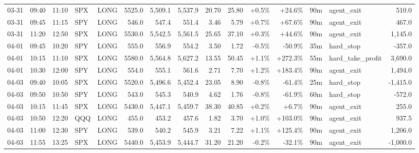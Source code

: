 \documentclass[11pt,a4paper,twoside]{article}
\begin{document}
\begin{landscape}
\begin{center}
\begin{longtable}{>{\color{txtmain}}l l l l l r r r r r r r r >{\color{txtmain}}l r}
03-31 & 09:40 & 11:10 & SPX & LONG & 5525.0 & 5,509.1 & 5,537.9 & 20.70 & 25.80 & \textcolor{wingreen}{+0.5\%} & \textcolor{wingreen}{+24.6\%} & 90m & agent\_exit & \textcolor{wingreen}{510.0} \\
03-31 & 09:45 & 11:15 & SPY & LONG & 546.0 & 547.4 & 551.4 & 3.46 & 5.79 & \textcolor{wingreen}{+0.7\%} & \textcolor{wingreen}{+67.6\%} & 90m & agent\_exit & \textcolor{wingreen}{467.0} \\
03-31 & 11:20 & 12:50 & SPX & LONG & 5530.0 & 5,542.5 & 5,561.5 & 25.65 & 37.10 & \textcolor{wingreen}{+0.3\%} & \textcolor{wingreen}{+44.6\%} & 90m & agent\_exit & \textcolor{wingreen}{1,145.0} \\
04-01 & 09:45 & 10:20 & SPY & LONG & 555.0 & 556.9 & 554.2 & 3.50 & 1.72 & \textcolor{lossred}{-0.5\%} & \textcolor{lossred}{-50.9\%} & 35m & hard\_stop & \textcolor{lossred}{-357.0} \\
04-01 & 10:15 & 11:10 & SPX & LONG & 5580.0 & 5,564.8 & 5,627.2 & 13.55 & 50.45 & \textcolor{wingreen}{+1.1\%} & \textcolor{wingreen}{+272.3\%} & 55m & hard\_take\_profit & \textcolor{wingreen}{3,690.0} \\
04-01 & 10:30 & 12:00 & SPY & LONG & 554.0 & 555.1 & 561.6 & 2.71 & 7.70 & \textcolor{wingreen}{+1.2\%} & \textcolor{wingreen}{+183.4\%} & 90m & agent\_exit & \textcolor{wingreen}{1,494.0} \\
04-03 & 09:40 & 10:05 & SPX & LONG & 5520.0 & 5,496.6 & 5,452.4 & 23.05 & 8.90 & \textcolor{lossred}{-0.8\%} & \textcolor{lossred}{-61.4\%} & 25m & hard\_stop & \textcolor{lossred}{-1,415.0} \\
04-03 & 09:50 & 10:50 & SPY & LONG & 543.0 & 545.3 & 540.9 & 4.62 & 1.76 & \textcolor{lossred}{-0.8\%} & \textcolor{lossred}{-61.9\%} & 60m & hard\_stop & \textcolor{lossred}{-572.0} \\
04-03 & 10:15 & 11:45 & SPX & LONG & 5430.0 & 5,447.1 & 5,459.7 & 38.30 & 40.85 & \textcolor{wingreen}{+0.2\%} & \textcolor{wingreen}{+6.7\%} & 90m & agent\_exit & \textcolor{wingreen}{255.0} \\
04-03 & 10:50 & 12:20 & QQQ & LONG & 455.0 & 453.2 & 457.6 & 1.82 & 3.70 & \textcolor{wingreen}{+1.0\%} & \textcolor{wingreen}{+103.0\%} & 90m & agent\_exit & \textcolor{wingreen}{937.5} \\
04-03 & 11:00 & 12:30 & SPY & LONG & 539.0 & 540.2 & 545.9 & 3.21 & 7.22 & \textcolor{wingreen}{+1.1\%} & \textcolor{wingreen}{+125.4\%} & 90m & agent\_exit & \textcolor{wingreen}{1,206.0} \\
04-03 & 11:55 & 13:25 & SPX & LONG & 5440.0 & 5,453.9 & 5,444.7 & 31.20 & 21.20 & \textcolor{lossred}{-0.2\%} & \textcolor{lossred}{-32.1\%} & 90m & agent\_exit & \textcolor{lossred}{-1,000.0} \\

\end{longtable}
\end{center}
\end{landscape}
\end{document}
